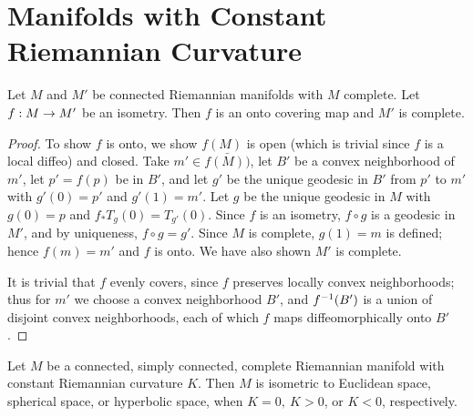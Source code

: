 \documentclass[../main]{subfiles}
\begin{document}
\section{Manifolds with Constant Riemannian Curvature}\label{ch10:s6}

\begin{theorem} \label{thm:ch10.6.1}
Let $M$ and $M'$ be connected Riemannian manifolds with $M$ complete. Let $f:M\to M'$ be an isometry. Then $f$ is an onto covering map and $M'$ is complete.
\end{theorem}

\begin{proof}
To show $f$ is onto, we show $f(M)$ is open (which is trivial since $f$ is a local diffeo) and closed. Take $m'\in\bar{f(M))}$, let $B'$ be a convex neighborhood of $m'$, let $p'=f(p)$ be in $B'$, and let $g'$ be the unique geodesic in $B'$ from $p'$ to $m'$ with $g'(0)=p'$ and $g'(1)=m'$. Let $g$ be the unique geodesic in $M$ with $g(0)=p$ and $f_*T_g(0)=T_{g'}(0)$. Since $f$ is an isometry, $f\circ g$ is a geodesic in $M'$, and by uniqueness, $f\circ g=g'$. Since $M$ is complete, $g(1)=m$ is defined; hence $f(m)=m'$ and $f$ is onto. We have also shown $M'$ is complete.

It is trivial that $f$ evenly covers, since $f$ preserves locally convex neighborhoods; thus for $m'$ we choose a convex neighborhood $B'$, and $f^{-1}(B')$ is a union of disjoint convex neighborhoods, each of which $f$ maps diffeomorphically onto $B'$.
\end{proof}



\begin{theorem} \label{thm:ch10.6.2}
Let $M$ be a connected, simply connected, complete Riemannian manifold with constant Riemannian curvature $K$. Then $M$ is isometric to Euclidean space, spherical space, or hyperbolic space, when $K=0,~K>0$, or $K<0$, respectively.
\end{theorem}
\end{document}
